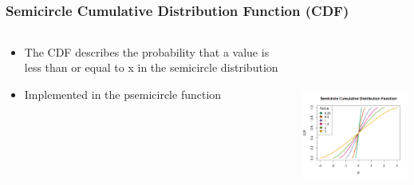 \documentclass[handout, xcolor=dvipsnames]{beamer}
\begin{document}
\subsection{}
\begin{frame}
	\frametitle{Semicircle Cumulative Distribution Function (CDF)}
            \begin{columns}[T]
                \begin{column}{.4\textwidth}
            	\begin{itemize}
                	\item The CDF describes the probability that a value is less than or equal to x in the semicircle distribution
                        \item Implemented in the psemicircle function
                    \end{itemize}
                \end{column}
                \begin{column}{.6\textwidth}
                    \includegraphics[width=6.5cm,height=6cm]{Figures/CDF_plot.png}
                \end{column}
            \end{columns}
\end{frame}
\end{document}
